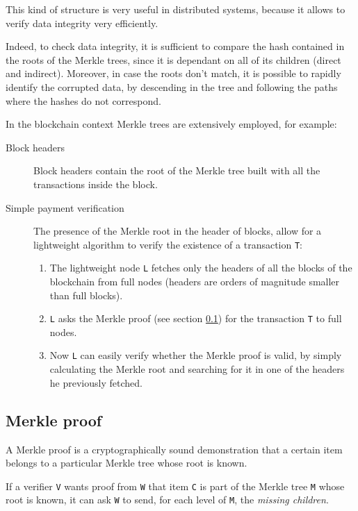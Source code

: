 \documentclass[11pt]{article}
\begin{document}
This kind of structure is very useful in distributed systems, because it allows to verify data integrity very efficiently.

Indeed, to check data integrity, it is sufficient to compare the hash contained in the roots of the Merkle trees, since it is dependant on all of its children (direct and indirect).
Moreover, in case the roots don't match, it is possible to rapidly identify the corrupted data, by descending in the tree and following the paths where the hashes do not correspond.

In the blockchain context Merkle trees are extensively employed, for example:
\begin{description}
    \item[Block headers] Block headers contain the root of the Merkle tree built with all the transactions inside the block.
    \item[Simple payment verification] The presence of the Merkle root in the header of blocks, allow for a lightweight algorithm to verify the existence of a transaction \verb|T|:
        \begin{enumerate}
            \item The lightweight node \verb|L| fetches only the headers of all the blocks of the blockchain from full nodes (headers are orders of magnitude smaller than full blocks).
            \item \verb|L| asks the Merkle proof (see section \ref{subsection:merkle_proof}) for the transaction \verb|T| to full nodes.
            \item Now \verb|L| can easily verify whether the Merkle proof is valid, by simply calculating the Merkle root and searching for it in one of the headers he previously fetched.
        \end{enumerate} 
\end{description}

\subsection{Merkle proof} \label{subsection:merkle_proof}
A Merkle proof is a cryptographically sound demonstration that a certain item belongs to a particular Merkle tree whose root is known.

If a verifier \verb|V| wants proof from \verb|W| that item \verb|C| is part of the Merkle tree \verb|M| whose root is known, it can ask \verb|W| to send, for each level of \verb|M|, the \textit{missing children}.
\end{document}

